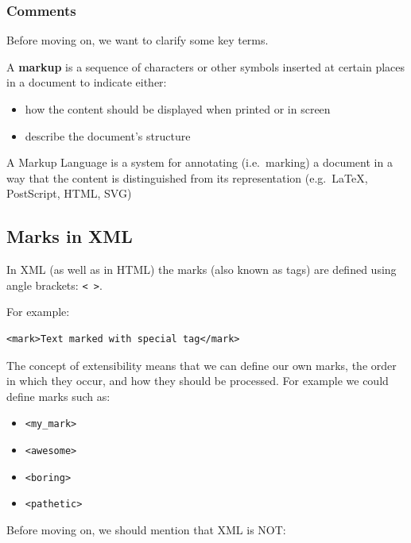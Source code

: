 \documentclass[
]{book}
\providecommand{\tightlist}{%
  \setlength{\itemsep}{0pt}\setlength{\parskip}{0pt}}
\begin{document}
\hypertarget{comments}{%
\subsubsection*{Comments}\label{comments}}

Before moving on, we want to clarify some key terms.

A \textbf{markup} is a sequence of characters or other symbols inserted at certain
places in a document to indicate either:

\begin{itemize}
\tightlist
\item
  how the content should be displayed when printed or in screen
\item
  describe the document's structure
\end{itemize}

A Markup Language is a system for annotating (i.e.~marking) a document in a
way that the content is distinguished from its representation (e.g.~LaTeX,
PostScript, HTML, SVG)

\hypertarget{marks-in-xml}{%
\subsection{Marks in XML}\label{marks-in-xml}}

In XML (as well as in HTML) the marks (also known as tags) are defined using
angle brackets: \texttt{\textless{}\ \textgreater{}}.

For example:

\begin{verbatim}
<mark>Text marked with special tag</mark>
\end{verbatim}

The concept of extensibility means that we can define our own marks, the order
in which they occur, and how they should be processed. For example we could
define marks such as:

\begin{itemize}
\tightlist
\item
  \texttt{\textless{}my\_mark\textgreater{}}
\item
  \texttt{\textless{}awesome\textgreater{}}
\item
  \texttt{\textless{}boring\textgreater{}}
\item
  \texttt{\textless{}pathetic\textgreater{}}
\end{itemize}

Before moving on, we should mention that XML is NOT:
\end{document}
